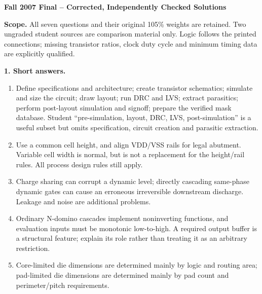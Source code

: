 \documentclass[10pt]{article}
\begin{document}
\begin{center}{\large\bfseries Fall 2007 Final -- Corrected, Independently Checked Solutions}\end{center}
\textbf{Scope.} All seven questions and their original 105\% weights are retained. Two ungraded student sources are comparison material only. Logic follows the printed connections; missing transistor ratios, clock duty cycle and minimum timing data are explicitly qualified.

\textbf{1. Short answers.}
\begin{enumerate}[label=(\alph*),leftmargin=7mm,itemsep=5pt]
\item Define specifications and architecture; create transistor schematics; simulate and size the circuit; draw layout; run DRC and LVS; extract parasitics; perform post-layout simulation and signoff; prepare the verified mask database. Student ``pre-simulation, layout, DRC, LVS, post-simulation'' is a useful subset but omits specification, circuit creation and parasitic extraction.
\item Use a common cell height, and align VDD/VSS rails for legal abutment. Variable cell width is normal, but is not a replacement for the height/rail rules. All process design rules still apply.
\item Charge sharing can corrupt a dynamic level; directly cascading same-phase dynamic gates can cause an erroneous irreversible downstream discharge. Leakage and noise are additional problems.
\item Ordinary N-domino cascades implement noninverting functions, and evaluation inputs must be monotonic low-to-high. A required output buffer is a structural feature; explain its role rather than treating it as an arbitrary restriction.
\item Core-limited die dimensions are determined mainly by logic and routing area; pad-limited die dimensions are determined mainly by pad count and perimeter/pitch requirements.
\end{enumerate}
\end{document}
